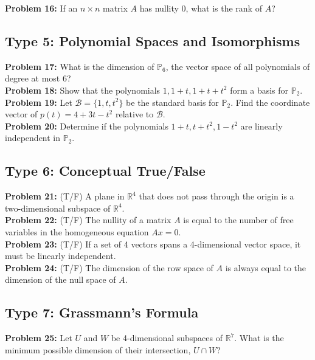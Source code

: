 \documentclass{article}
\begin{document}
\textbf{Problem 16:} If an $n \times n$ matrix $A$ has nullity 0, what is the rank of $A$? \\

\subsection*{Type 5: Polynomial Spaces and Isomorphisms}
\textbf{Problem 17:} What is the dimension of $\mathbb{P}_6$, the vector space of all polynomials of degree at most 6? \\

\textbf{Problem 18:} Show that the polynomials $1, 1+t, 1+t+t^2$ form a basis for $\mathbb{P}_2$. \\

\textbf{Problem 19:} Let $\mathcal{B} = \{1, t, t^2\}$ be the standard basis for $\mathbb{P}_2$. Find the coordinate vector of $p(t) = 4 + 3t - t^2$ relative to $\mathcal{B}$. \\

\textbf{Problem 20:} Determine if the polynomials $1+t, t+t^2, 1-t^2$ are linearly independent in $\mathbb{P}_2$. \\

\subsection*{Type 6: Conceptual True/False}
\textbf{Problem 21:} (T/F) A plane in $\mathbb{R}^4$ that does not pass through the origin is a two-dimensional subspace of $\mathbb{R}^4$. \\

\textbf{Problem 22:} (T/F) The nullity of a matrix $A$ is equal to the number of free variables in the homogeneous equation $Ax = 0$. \\

\textbf{Problem 23:} (T/F) If a set of 4 vectors spans a 4-dimensional vector space, it must be linearly independent. \\

\textbf{Problem 24:} (T/F) The dimension of the row space of $A$ is always equal to the dimension of the null space of $A$. \\

\subsection*{Type 7: Grassmann's Formula}
\textbf{Problem 25:} Let $U$ and $W$ be 4-dimensional subspaces of $\mathbb{R}^7$. What is the minimum possible dimension of their intersection, $U \cap W$? \\
\end{document}

